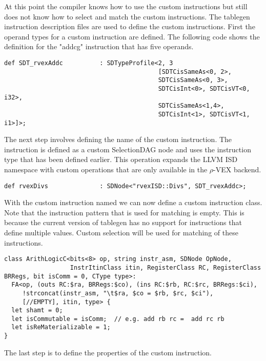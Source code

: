 At this point the compiler knows how to use the custom instructions but still does not know how to select and match the custom instructions. The tablegen instruction description files are used to define the custom instructions. First the operand types for a custom instruction are defined. The following code shows the definition for the "addcg" instruction that has five operands. 

\begin{lstlisting}
def SDT_rvexAddc          : SDTypeProfile<2, 3
                                          [SDTCisSameAs<0, 2>,
                                          SDTCisSameAs<0, 3>,
                                          SDTCisInt<0>, SDTCisVT<0, i32>,
                                          SDTCisSameAs<1,4>,
                                          SDTCisInt<1>, SDTCisVT<1, i1>]>;
\end{lstlisting}

The next step involves defining the name of the custom instruction. The instruction is defined as a custom SelectionDAG node and uses the instruction type that has been defined earlier. This operation expands the LLVM ISD namespace with custom operations that are only available in the $\rho$-VEX backend.

\begin{lstlisting}
def rvexDivs              : SDNode<"rvexISD::Divs", SDT_rvexAddc>;
\end{lstlisting}

With the custom instruction named we can now define a custom instruction class. Note that the instruction pattern that is used for matching is empty. This is because the current version of tablegen has no support for instructions that define multiple values. Custom selection will be used for matching of these instructions.

\begin{lstlisting}
class ArithLogicC<bits<8> op, string instr_asm, SDNode OpNode,
                  InstrItinClass itin, RegisterClass RC, RegisterClass BRRegs, bit isComm = 0, CType type>:
  FA<op, (outs RC:$ra, BRRegs:$co), (ins RC:$rb, RC:$rc, BRRegs:$ci),
     !strconcat(instr_asm, "\t$ra, $co = $rb, $rc, $ci"),
     [//EMPTY], itin, type> {
  let shamt = 0;
  let isCommutable = isComm;  // e.g. add rb rc =  add rc rb
  let isReMaterializable = 1;
}
\end{lstlisting}

The last step is to define the properties of the custom instruction.

